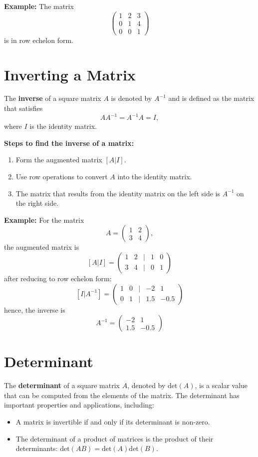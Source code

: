 \documentclass[]{article}
\begin{document}
	\textbf{Example:} The matrix
	$$
	\begin{pmatrix}
		1 & 2 & 3 \\
		0 & 1 & 4 \\
		0 & 0 & 1
	\end{pmatrix}
	$$
	is in row echelon form.
	
	\section{Inverting a Matrix}
	
	The \textbf{inverse} of a square matrix $A$ is denoted by $A^{-1}$ and is defined as the matrix that satisfies
	$$
	AA^{-1} = A^{-1}A = I,
	$$
	where $I$ is the identity matrix.
	
	\textbf{Steps to find the inverse of a matrix:}
	\begin{enumerate}
		\item Form the augmented matrix $[A | I]$.
		\item Use row operations to convert $A$ into the identity matrix.
		\item The matrix that results from the identity matrix on the left side is $A^{-1}$ on the right side.
	\end{enumerate}
	
	\noindent \textbf{Example:} For the matrix
	$$
	A = \begin{pmatrix} 1 & 2 \\ 3 & 4 \end{pmatrix},
	$$
	the augmented matrix is
	$$
	[A | I] = \begin{pmatrix}
		1 & 2 & \mid & 1 & 0\\
		3 & 4 & \mid & 0 & 1
	\end{pmatrix}
	$$
	after reducing to row echelon form:
	$$
	[I | A^{-1}] = \begin{pmatrix}
		1 & 0 & \mid & -2 & 1\\
		0 & 1 & \mid & 1.5 & -0.5
	\end{pmatrix}
	$$
	hence, the inverse is
	$$
	A^{-1} = \begin{pmatrix}
		-2 & 1\\
		1.5 & -0.5
	\end{pmatrix}
	$$
	
	\section{Determinant}
	
	The \textbf{determinant} of a square matrix $A$, denoted by $\text{det}(A)$, is a scalar value that can be computed from the elements of the matrix. The determinant has important properties and applications, including:
	\begin{itemize}
		\item A matrix is invertible if and only if its determinant is non-zero.
		\item The determinant of a product of matrices is the product of their determinants: $\text{det}(AB) = \text{det}(A)\text{det}(B)$.
	\end{itemize}
	
\end{document}
